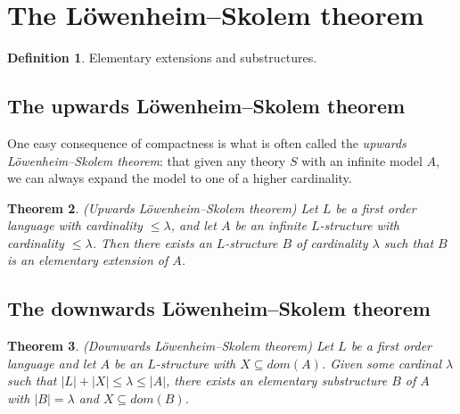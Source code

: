 \documentclass[10pt, a4paper, oneside]{article}
\newtheorem{thm}{Theorem}[section]
\theoremstyle{definition}
\newtheorem{dfn}[thm]{Definition}
\theoremstyle{remark}
\theoremstyle{plain}
\begin{document}
\section{The Löwenheim--Skolem theorem}

\begin{dfn}
    Elementary extensions and substructures.
\end{dfn}

\subsection{The upwards Löwenheim--Skolem theorem}

One easy consequence of compactness is what is often called the \emph{upwards
Löwenheim--Skolem theorem}: that given any theory $S$ with an infinite model
$A$, we can always expand the model to one of a higher cardinality.

\begin{thm}
    (Upwards Löwenheim--Skolem theorem) Let $L$ be a first order language with
    cardinality $\leq \lambda$, and let $A$ be an infinite $L$-structure with
    cardinality $\leq \lambda$. Then there exists an $L$-structure $B$ of
    cardinality $\lambda$ such that $B$ is an elementary extension of $A$.
\end{thm}

\subsection{The downwards Löwenheim--Skolem theorem}

\begin{thm}
    (Downwards Löwenheim--Skolem theorem) Let $L$ be a first order language and
    let $A$ be an $L$-structure with $X \subseteq dom(A)$. Given some cardinal
    $\lambda$ such that $|L| + |X| \leq \lambda \leq |A|$, there exists an
    elementary substructure $B$ of $A$ with $|B| = \lambda$ and
    $X \subseteq dom(B)$.
\end{thm}




\end{document}
